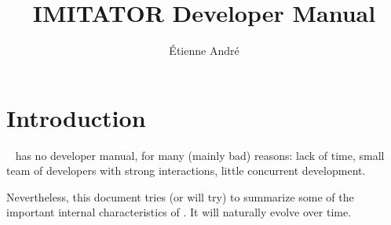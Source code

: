 
\newcommand{\titleOnHeader}{\textsf{IMITATOR} \emph{not} a Developer Manual}

\newcommand{\titleOnFirstPage}{IMITATOR \emph{not} a Developer Manual}



\newcommand{\validator}{\textsf{VALIDATOR}}


\title{IMITATOR Developer Manual}
\author{Étienne André}
	










\chapter{Introduction}

\imitator{}~\cite{Andre21} has no developer manual, for many (mainly bad) reasons:
lack of time, small team of developers with strong interactions, little concurrent development.

Nevertheless, this document tries (or will try) to summarize some of the important internal characteristics of \imitator{}.
It will naturally evolve over time.


